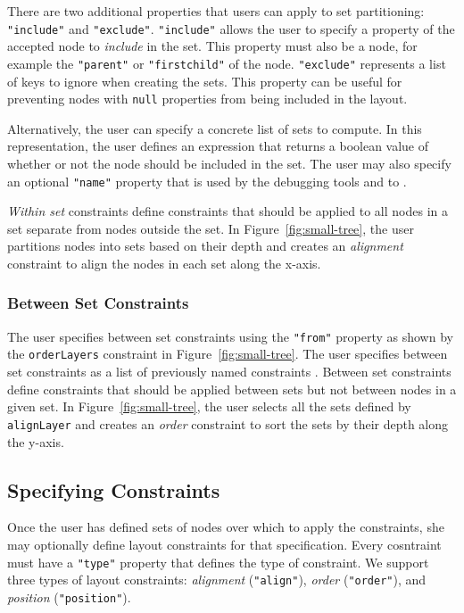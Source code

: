 There are two additional properties that users can apply to set partitioning: \texttt{"include"} and \texttt{"exclude"}. \texttt{"include"} allows the user to specify a property of the accepted node to \emph{include} in the set. This property must also be a node, for example the \texttt{"parent"} or \texttt{"firstchild"} of the node. \texttt{"exclude"} represents a list of keys to ignore when creating the sets. This property can be useful for preventing nodes with \texttt{null} properties from being included in the layout. 

Alternatively, the user can specify a concrete list of sets to compute. In this representation, the user defines an expression that returns a boolean value of whether or not the node should be included in the set. The user may also specify an optional \texttt{"name"} property that is used by the debugging tools and to . 

\emph{Within set} constraints define constraints that should be applied to all nodes in a set separate from nodes outside the set. In Figure~\ref{fig:small-tree}, the user partitions nodes into sets based on their depth and creates an \emph{alignment} constraint to align the nodes in each set along the x-axis.

\subsubsection{Between Set Constraints}
The user specifies between set constraints using the \texttt{"from"} property as shown by the \texttt{orderLayers} constraint in Figure~\ref{fig:small-tree}. The user specifies between set constraints as a list of previously named constraints . Between set constraints define constraints that should be applied between sets but not between nodes in a given set. In Figure~\ref{fig:small-tree}, the user selects all the sets defined by \texttt{alignLayer} and creates an \emph{order} constraint to sort the sets by their depth along the y-axis.

\subsection{Specifying Constraints}
Once the user has defined sets of nodes over which to apply the constraints, she may optionally define layout constraints for that specification. Every cosntraint must have a \texttt{"type"} property that defines the type of constraint. We support three types of layout constraints: \emph{alignment} (\texttt{"align"}), \emph{order} (\texttt{"order"}), and \emph{position} (\texttt{"position"}).

